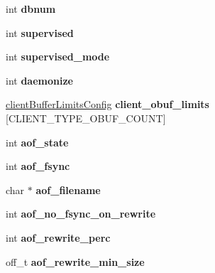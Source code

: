 \begin{DoxyCompactItemize}
\mbox{\label{structredisServer_a62d9b4dfd9fa2999fdeafb9756759e40}} 
int {\bfseries dbnum}
\item 
\mbox{\label{structredisServer_a47747e9cd98cf4e7043ec903cc8f649b}} 
int {\bfseries supervised}
\item 
\mbox{\label{structredisServer_a6d541adaa8251cf1461bfcd4cef8c80a}} 
int {\bfseries supervised\+\_\+mode}
\item 
\mbox{\label{structredisServer_a6b46cd70523fa48579926a8076f255d0}} 
int {\bfseries daemonize}
\item 
\mbox{\label{structredisServer_a05ef7ed8f9963a82ac702d63f3a614b2}} 
\hyperlink{structclientBufferLimitsConfig}{client\+Buffer\+Limits\+Config} {\bfseries client\+\_\+obuf\+\_\+limits} \mbox{[}C\+L\+I\+E\+N\+T\+\_\+\+T\+Y\+P\+E\+\_\+\+O\+B\+U\+F\+\_\+\+C\+O\+U\+NT\mbox{]}
\item 
\mbox{\label{structredisServer_a270897ee49d52a6425194e9b62f7fddb}} 
int {\bfseries aof\+\_\+state}
\item 
\mbox{\label{structredisServer_acf1c107b53e95affc31388b376d27580}} 
int {\bfseries aof\+\_\+fsync}
\item 
\mbox{\label{structredisServer_aa30b4b020b1f8654bd11cdf8e90bad53}} 
char $\ast$ {\bfseries aof\+\_\+filename}
\item 
\mbox{\label{structredisServer_a7d8159bcb94b36f3d47e723ab0ea9e50}} 
int {\bfseries aof\+\_\+no\+\_\+fsync\+\_\+on\+\_\+rewrite}
\item 
\mbox{\label{structredisServer_a78f9691cee073872ea04fb16a5fbcc21}} 
int {\bfseries aof\+\_\+rewrite\+\_\+perc}
\item 
\mbox{\label{structredisServer_afd6c5e6df48ef42024e59927c66d3315}} 
off\+\_\+t {\bfseries aof\+\_\+rewrite\+\_\+min\+\_\+size}
\item 
\mbox{\label{structredisServer_ae56c64dbdb28d4a92b5b5cf9522584e5}} 

\end{DoxyCompactItemize}
